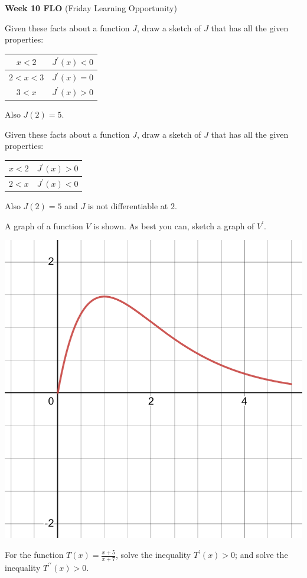 \documentclass[12pt,fleqn,answers]{exam}
\begin{document}
\vspace{0.1in}

\noindent \textbf{Week 10 FLO} (Friday Learning Opportunity) 

\begin{questions}  
    
 \question Given these facts about a function $J$, draw a sketch of $J$ that has all the given properties:
 
  \begin{tabular}{|c|c|}  \hline \hline 
 $ x < 2$  & $J^\prime(x) < 0$ \\  \hline
 $ 2 < x < 3$   & $J^\prime (x) = 0$ \\  \hline
  $ 3 < x $   & $J^\prime(x) > 0$  \\ \hline
 \end{tabular}
 
 Also $J(2) = 5$.
 
  \question Given these facts about a function $J$, draw a sketch of $J$ that has all the given properties:
  
  \begin{tabular}{|c|c|}  \hline  \hline
 $ x < 2$  & $J^\prime(x) > 0$ \\  \hline
   $ 2 < x $   & $J^\prime(x) < 0$\\  \hline
 \end{tabular}
 
 Also $J(2) = 5$ and $J$ is not differentiable at $2$.
 
 
 \question A graph of a function $V$ is shown.  As best you can, sketch a graph of $V^\prime$.
 
 \includegraphics[scale=0.2]{desmos-graph(38)}
 
 \question For the function $T(x) = \frac{x+5}{x+7}$, solve the inequality  $T^\prime(x) > 0$; and solve the 
 inequality $T^{\prime \prime}(x) > 0$.
\end{questions}
\end{document}
